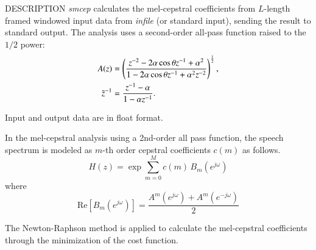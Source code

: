 \begin{synopsis}
\item [smcep] [ --a $A$ ] [ --t $T$ ] [ --m $M$ ] [ --l $L$ ] [ --q $Q$ ]
\item [\ ~~~~] [ --i $I$ ] [ --j $J$ ] [ --d $D$ ] [ --e $E$ ] [ --f $F$ ] [ {\em infile} ]
\end{synopsis}

\begin{qsection}{DESCRIPTION}
{\em smcep} calculates the mel-cepstral coefficients 
from $L$-length framed windowed input data 
from {\em infile} (or standard input), 
sending the result to standard output. 
The analysis uses a second-order all-pass function raised to the $1/2$ power: 
\begin{align}
A(z) &=
\left(
\frac{z^{-2}-2\alpha \cos \theta z^{-1}+\alpha^2}
	{1-2\alpha \cos \theta z^{-1}+\alpha^2 z^{-2}}
\right)^{\frac{1}{2}}, \notag \\
\tilde{z}^{-1} &= \frac{z^{-1}-\alpha}{1-\alpha z^{-1}}. \notag
\end{align}

Input and output data are in float format.

In the mel-cepstral analysis using
a 2nd-order all pass function,
the speech spectrum is modeled as $m$-th order cepstral
coefficients $c(m)$ as follows.
\begin{displaymath}
H(z) = \exp \sum_{m=0}^{M} c(m)\,B_m(e^{j\omega})
\end{displaymath}
where
\begin{displaymath}
\mathrm{Re}\left[B_m(e^{j\omega})\right]
	= \frac{A^m(e^{j\omega})+A^m(e^{-j\omega})}{2}
\end{displaymath}
\par The Newton-Raphson method is applied to calculate
the mel-cepstral coefficients through the minimization
of the cost function.
\end{qsection}

